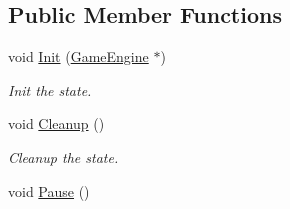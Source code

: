 \subsection*{Public Member Functions}
\begin{DoxyCompactItemize}
\item 
void \hyperlink{class_intro_state_a88661f54a40cf3d1e3785b3eca900c9a}{Init} (\hyperlink{class_game_engine}{Game\+Engine} $\ast$)
\begin{DoxyCompactList}\small\item\em Init the state. \end{DoxyCompactList}\item 
void \hyperlink{class_intro_state_ad723da4e2d552a3f719d2f69f3cce87d}{Cleanup} ()
\begin{DoxyCompactList}\small\item\em Cleanup the state. \end{DoxyCompactList}\item 
\hypertarget{class_intro_state_a0d2a5b085e920e206c47f253bdbfc510}{}void \hyperlink{class_intro_state_a0d2a5b085e920e206c47f253bdbfc510}{Pause} ()\label{class_intro_state_a0d2a5b085e920e206c47f253bdbfc510}


\end{DoxyCompactItemize}
